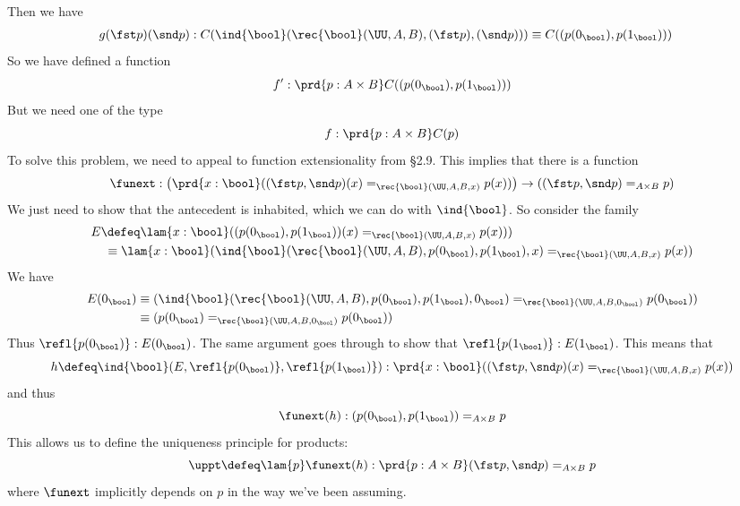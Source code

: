     Then we have
    \begin{align*}
    g(\fst p)(\snd p) 
    &: C(\ind{\bool}(\rec{\bool}(\UU, A, B), (\fst p), (\snd p)))
    \equiv 
    C((p(0_{\bool}), p(1_{\bool})))
    \end{align*}
    So we have defined a function
    \[
    f' : \prd{p : A \times B} C((p(0_{\bool}), p(1_{\bool})))
    \]
    But we need one of the type
    \[
    f : \prd{p : A \times B} C(p)
    \]
    To solve this problem, we need to appeal to function extensionality from \S2.9.
    This implies that there is a function
    \[
    \funext : 
    \left(\prd{x:\bool} ((\fst p, \snd p)(x) =_{\rec{\bool}(\UU, A, B, x)} p(x))\right)
    \to 
    ((\fst p, \snd p) =_{A \times B} p)
    \]
    We just need to show that the antecedent is inhabited, which we can do with
        $\ind{\bool}$.  So consider the family
        \begin{align*}
        E &\defeq 
        \lam{x : \bool} 
        ((p(0_{\bool}), p(1_{\bool}))(x) =_{\rec{\bool}(\UU, A, B, x)}  p(x)))
        \\&\phantom{:}\equiv
        \lam{x : \bool} 
        (\ind{\bool}(\rec{\bool}(\UU, A, B), p(0_{\bool}), p(1_{\bool}), x)
        =_{\rec{\bool}(\UU, A, B, x)} p(x))
        \end{align*}
        We have
        \begin{align*}
        E(0_{\bool})
        &\equiv
        (\ind{\bool}(\rec{\bool}(\UU, A, B),
        p(0_{\bool}), p(1_{\bool}), 0_{\bool}) =_{\rec{\bool}(\UU, A, B, 0_{\bool})}
        p(0_{\bool}))
        \\&\equiv
        (p(0_{\bool}) =_{\rec{\bool}(\UU, A, B, 0_{\bool})} p(0_{\bool}))
        \end{align*}
        Thus $\refl{p(0_{\bool})} : E(0_{\bool})$.  The same argument goes through to
        show that $\refl{p(1_{\bool})} : E(1_{\bool})$.  This means that
        \[
        h \defeq
        \ind{\bool}(E, \refl{p(0_{\bool})}, \refl{p(1_{\bool})})
        :
        \prd{x : \bool} ((\fst p, \snd p)(x) =_{\rec{\bool}(\UU, A, B, x)} p(x))
        \]
        and thus
        \[
        \funext(h) 
        : 
        (p(0_{\bool}), p(1_{\bool}))
        =_{A \times B} 
        p 
        \]
        This allows us to define the uniqueness principle for products:
        \[
        \uppt \defeq \lam{p}\funext(h)  
        : \prd{p:A \times B} 
        (\fst p, \snd p)
        =_{A \times B} 
        p 
        \]
        where $\funext$ implicitly depends on $p$ in the way we've been assuming.
